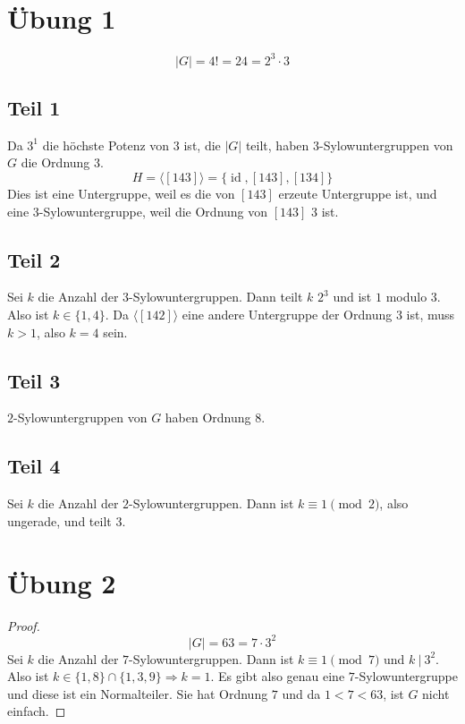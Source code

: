 \documentclass[10pt,a4paper]{article}
\DeclareMathOperator{\id}{id}
\begin{document}
\section{Übung 1}

\begin{equation}
  |G| = 4! = 24 = 2^{3} \cdot 3
\end{equation}

\subsection{Teil 1}

Da $3^{1}$ die höchste Potenz von $3$ ist, die $|G|$ teilt, haben 3-Sylowuntergruppen von $G$ die Ordnung 3.
\begin{equation}
  H = \langle [143] \rangle = \{ \id, [143], [134] \}
\end{equation}
Dies ist eine Untergruppe, weil es die von $[143]$ erzeute Untergruppe ist, und eine 3-Sylowuntergruppe, weil die Ordnung von $[143]$ 3 ist.

\subsection{Teil 2}

Sei $k$ die Anzahl der 3-Sylowuntergruppen.
Dann teilt $k$ $2^{3}$ und ist $1$ modulo $3$.
Also ist $k \in \{ 1,4 \}$.
Da $\langle [142] \rangle$ eine andere Untergruppe der Ordnung $3$ ist, muss $k > 1$, also $k = 4$ sein.

\subsection{Teil 3}

$2$-Sylowuntergruppen von $G$ haben Ordnung $8$.

\subsection{Teil 4}

Sei $k$ die Anzahl der $2$-Sylowuntergruppen.
Dann ist $k \equiv 1 \pmod{2}$, also ungerade, und teilt 3.

\section{Übung 2}

\begin{proof}
  \begin{equation}
    |G| = 63 = 7 \cdot 3^{2}
  \end{equation}
  Sei $k$ die Anzahl der $7$-Sylowuntergruppen.
  Dann ist $k \equiv 1 \pmod{7}$ und $k\ \vert\ 3^{2}$.
  Also ist $k \in \{ 1, 8 \} \cap \{ 1, 3, 9 \} \Rightarrow k = 1$.
  Es gibt also genau eine $7$-Sylowuntergruppe und diese ist ein Normalteiler.
  Sie hat Ordnung $7$ und da $1 < 7 < 63$, ist $G$ nicht einfach.
\end{proof}
\end{document}
